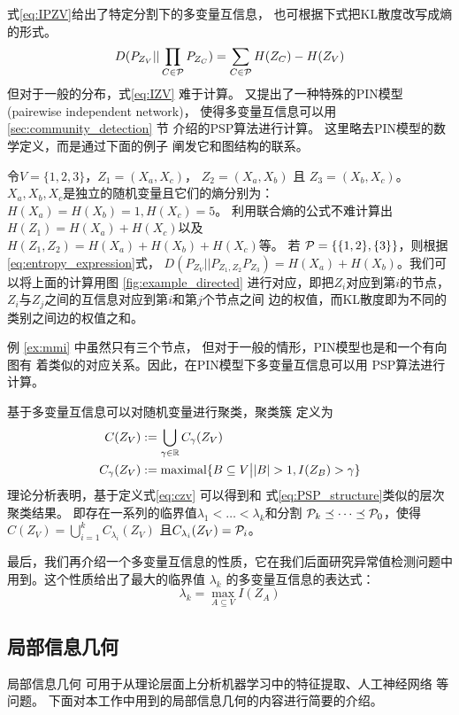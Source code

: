 式\eqref{eq:IPZV}给出了特定分割下的多变量互信息，
也可根据下式把KL散度改写成熵的形式。
\begin{equation}\label{eq:entropy_expression}
  D(P_{Z_V} || \prod_{C\in \P} P_{Z_C}) 
  = \sum_{C \in \P}
  H(Z_C) - H(Z_V)
\end{equation}
但对于一般的分布，式\eqref{eq:IZV}
难于计算。\citet{ska} 又提出了一种特殊的PIN模型
(pairewise independent network)\cite{chan2017pin}，
使得多变量互信息可以用 \ref{sec:community_detection} 节
介绍的PSP算法进行计算。
这里略去PIN模型的数学定义，而是通过下面的例子
阐发它和图结构的联系。
\begin{example}\label{ex:mmi}
  令$V=\{1,2,3\}$，$Z_1=(X_a, X_c)$，
  $Z_2=(X_a,X_b)$ 且 $Z_3=(X_b,X_c)$。
  $X_a,X_b,X_c$是独立的随机变量且它们的熵分别为：
  $H(X_a)=H(X_b)=1, H(X_c)=5$。
  利用联合熵的公式不难计算出$H(Z_1)=H(X_a)+H(X_c)$以及
  $H(Z_1, Z_2) = H(X_a) + H(X_b) + H(X_c)$等。
  若 $\P=\{\{1,2\}, \{3\}\}$，则根据
  \eqref{eq:entropy_expression}式，
  $D(P_{Z_V}||P_{Z_1,Z_2}P_{Z_3}) = H(X_a)
  +H(X_b)$。我们可以将上面的计算用图 \ref{fig:example_directed} 
  进行对应，即把$Z_i$对应到第$i$的节点，
  $Z_i$与$Z_j$之间的互信息对应到第$i$和第$j$个节点之间
  边的权值，而KL散度即为不同的类别之间边的权值之和。
\end{example}
例 \ref{ex:mmi} 中虽然只有三个节点，
但对于一般的情形，PIN模型也是和一个有向图有
着类似的对应关系。因此，在PIN模型下多变量互信息可以用
PSP算法进行计算。

基于多变量互信息可以对随机变量进行聚类，聚类簇
定义为
\begin{align}
  C(Z_V) &:= \bigcup_{\gamma \in \R} C_{\gamma}(Z_V)
  \label{eq:czv}\\
  C_{\gamma}(Z_V) &:= \textrm{maximal}
  \{ B \subseteq V \big\vert |B|>1, I(Z_B) > \gamma  \}
\end{align}
理论分析表明，基于定义式\eqref{eq:czv} 可以得到和
式\eqref{eq:PSP_structure}类似的层次聚类结果。
即存在一系列的临界值$\lambda_1 < \dots < \lambda_k$和分割
$\P_k \preceq \dots \preceq \P_0$，使得
$C(Z_V) = \bigcup_{i=1}^{k} C_{\lambda_i}(Z_V)$
且$C_{\lambda_i}(Z_V) = \P_i$。

最后，我们再介绍一个多变量互信息的性质，它在我们后面研究异常值检测问题中
用到。这个性质给出了最大的临界值 $\lambda_k$
的多变量互信息的表达式\cite{agg_ic}：
\begin{equation}\label{eq:largest_threshold}
\lambda_k = \max_{A\subseteq V} I(Z_A)
\end{equation}

\subsection{局部信息几何}\label{sec:local_geometry}
局部信息几何\cite{huang2019universal}
可用于从理论层面上分析机器学习中的特征提取\cite{huang2017information}、人工神经网络
\cite{huang2019information}等问题。
下面对本工作中用到的局部信息几何的内容进行简要的介绍。


